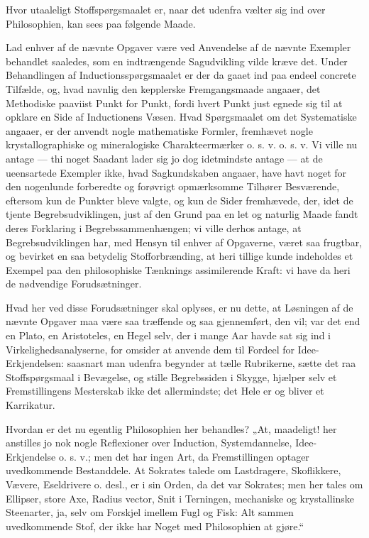 \documentclass[12pt]{book}
\newcommand{\opage}[1]{\marginnote{\footnotesize\textit{[#1]}}}
\begin{document}
Hvor utaaleligt Stoffspørgsmaalet er, naar det udenfra vælter sig ind over Philosophien, kan sees paa
følgende Maade.

Lad enhver af de nævnte Opgaver være ved Anvendelse af de nævnte Exempler behandlet saaledes, som en
indtrængende Sagudvikling vilde kræve det. Under Behandlingen af Inductionsspørgsmaalet er der da
gaaet ind paa endeel concrete Tilfælde, og, hvad navnlig den kepplerske Fremgangsmaade angaaer, det
Methodiske paaviist Punkt for Punkt,
fordi hvert Punkt just egnede sig til at opklare en Side af Inductionens Væsen. Hvad Spørgsmaalet om
det Systematiske angaaer, er der anvendt nogle mathematiske
\opage{202} Formler, fremhævet nogle krystallographiske og mineralogiske Charakteermærker o. s. v. o. s. v. Vi
ville nu antage --- thi noget Saadant lader sig jo dog idetmindste antage --- at de ueensartede
Exempler ikke, hvad Sagkundskaben angaaer, have havt noget for den nogenlunde forberedte og forøvrigt
opmærksomme Tilhører Besværende, eftersom kun de Punkter bleve valgte, og kun de Sider fremhævede, der,
idet de tjente Begrebsudviklingen, just af den Grund paa en let og naturlig Maade fandt deres
Forklaring i Begrebssammenhængen; vi ville derhos antage, at Begrebsudviklingen har, med Hensyn til
enhver af Opgaverne, været saa frugtbar, og bevirket en saa betydelig Stofforbrænding, at heri tillige
kunde indeholdes et Exempel paa den philosophiske Tænknings assimilerende Kraft: vi have da heri de
nødvendige Forudsætninger.

Hvad her ved disse Forudsætninger skal oplyses, er nu dette, at Løsningen af de nævnte Opgaver maa være
saa træffende og saa gjennemført, den vil; var det end en Plato, en Aristoteles, en Hegel selv, der i
mange Aar havde sat sig ind i Virkelighedsanalyserne, for omsider at anvende dem til Fordeel for
Idee-Erkjendelsen: saasnart man udenfra begynder at tælle Rubrikerne, sætte det raa Stoffspørgsmaal i
Bevægelse, og stille Begrebssiden i Skygge, hjælper selv et Fremstillingens Mesterskab ikke det
allermindste; det Hele er og bliver et Karrikatur.

Hvordan er det nu egentlig Philosophien her behandles? „At, maadeligt! her anstilles jo nok nogle
Reflexioner over Induction, Systemdannelse, Idee-Erkjendelse o. s. v.; men det har ingen Art, da
Fremstillingen optager uvedkommende Bestanddele. At Sokrates talede om Lastdragere, Skoflikkere,
Vævere, Eseldrivere o. desl., er i sin Orden, da det var Sokrates; men her tales om Ellipser, store
Axe, Radius vector, Snit i Terningen, mechaniske og krystallinske Steenarter, ja, selv om Forskjel
imellem Fugl og Fisk: Alt%
\opage{203}sammen uvedkommende Stof, der ikke har Noget med Philosophien at gjøre.“
\end{document}
